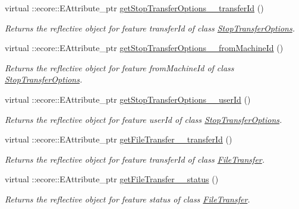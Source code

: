 \begin{DoxyCompactItemize}
virtual ::ecore::EAttribute\_\-ptr \hyperlink{classFMS__Data_1_1FMS__DataPackage_a3e11dabaca57c85535e1e767a6c598b8}{getStopTransferOptions\_\-\_\-transferId} ()
\begin{DoxyCompactList}\small\item\em Returns the reflective object for feature transferId of class \hyperlink{classFMS__Data_1_1StopTransferOptions}{StopTransferOptions}. \item\end{DoxyCompactList}\item 
virtual ::ecore::EAttribute\_\-ptr \hyperlink{classFMS__Data_1_1FMS__DataPackage_a94d73aecfdb8dda0a3074c751b609ee0}{getStopTransferOptions\_\-\_\-fromMachineId} ()
\begin{DoxyCompactList}\small\item\em Returns the reflective object for feature fromMachineId of class \hyperlink{classFMS__Data_1_1StopTransferOptions}{StopTransferOptions}. \item\end{DoxyCompactList}\item 
virtual ::ecore::EAttribute\_\-ptr \hyperlink{classFMS__Data_1_1FMS__DataPackage_af00e3fb91c4d8e5967b65855bb57364a}{getStopTransferOptions\_\-\_\-userId} ()
\begin{DoxyCompactList}\small\item\em Returns the reflective object for feature userId of class \hyperlink{classFMS__Data_1_1StopTransferOptions}{StopTransferOptions}. \item\end{DoxyCompactList}\item 
virtual ::ecore::EAttribute\_\-ptr \hyperlink{classFMS__Data_1_1FMS__DataPackage_a713df2abf5852aacfb75a628e78a7730}{getFileTransfer\_\-\_\-transferId} ()
\begin{DoxyCompactList}\small\item\em Returns the reflective object for feature transferId of class \hyperlink{classFMS__Data_1_1FileTransfer}{FileTransfer}. \item\end{DoxyCompactList}\item 
virtual ::ecore::EAttribute\_\-ptr \hyperlink{classFMS__Data_1_1FMS__DataPackage_a30196a17800bae6637e9d2789e044915}{getFileTransfer\_\-\_\-status} ()
\begin{DoxyCompactList}\small\item\em Returns the reflective object for feature status of class \hyperlink{classFMS__Data_1_1FileTransfer}{FileTransfer}. \item\end{DoxyCompactList}\item 

\end{DoxyCompactItemize}
